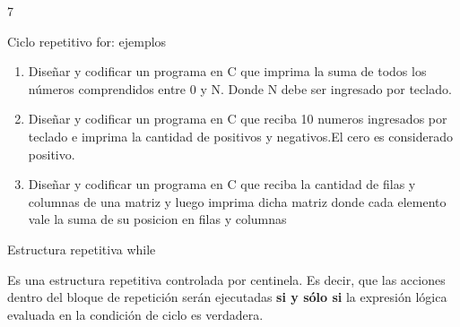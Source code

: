 7\documentclass[xcolor=pdftex,table,11pt]{beamer}
\begin{document}
\begin{frame}{Ciclo repetitivo for: ejemplos}
 \begin{enumerate}
   
     \item Diseñar y codificar un programa en C que imprima la suma de todos los números comprendidos entre 0 y N. Donde N debe ser ingresado por teclado.
\href{https://github.com/danis963/informaticaI_IUA/blob/main/c/src/3-4-for.c}{}


  \item Diseñar y codificar un programa en C que reciba 10 numeros ingresados por teclado e imprima la cantidad de positivos y negativos.El cero es considerado positivo.
\href{https://github.com/danis963/informaticaI_IUA/blob/main/c/src/3-2-for.c}{}


  \item Diseñar y codificar un programa en C que reciba
la cantidad de filas y columnas de una matriz y luego imprima 
dicha matriz donde cada elemento vale la suma de su posicion en filas y columnas
\href{https://github.com/danis963/informaticaI_IUA/blob/main/c/src/3-5-for.c}{}

   \end{enumerate}
   

\end{frame}



\begin{frame}{Estructura repetitiva while}
\begin{block}{}
 Es una estructura repetitiva controlada por centinela. Es decir, que las acciones dentro del bloque de repetición serán ejecutadas \textbf{si y sólo si} la expresión lógica evaluada en la condición de ciclo es verdadera. 
\end{block}
\end{frame}
\end{document}
